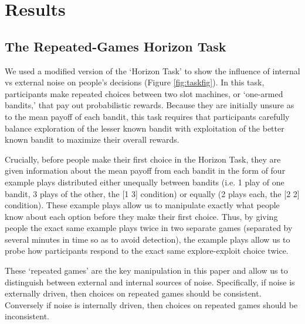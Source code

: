\documentclass[12pt]{article}
\begin{document}
	
	
	
	
	\section*{Results}
	
	\subsection*{The Repeated-Games Horizon Task}
	We used a modified version of the `Horizon Task' \citep{wilson2014} to show the influence of internal vs external noise on people's decisions (Figure \ref{fig:taskfig}). In this task, participants make repeated choices between two slot machines, or `one-armed bandits,' that pay out probabilistic rewards. Because they are initially unsure as to the mean payoff of each bandit, this task requires that participants carefully balance exploration of the lesser known bandit with exploitation of the better known bandit to maximize their overall rewards. 
	
	Crucially, before people make their first choice in the Horizon Task, they are given information about the mean payoff from each bandit in the form of four example plays distributed either unequally between bandits (i.e. 1 play of one bandit, 3 plays of the other, the [1 3] condition) or equally (2 plays each, the [2 2] condition). These example plays allow us to manipulate exactly what people know about each option before they make their first choice. Thus, by giving people the exact same example plays twice in two separate games (separated by several minutes in time so as to avoid detection), the example plays allow us to probe how participants respond to the exact same explore-exploit choice twice.  
	
	These `repeated games' are the key manipulation in this paper and allow us to distinguish between external and internal sources of noise.  Specifically, if noise is externally driven, then choices on repeated games should be consistent. Conversely if noise is internally driven, then choices on repeated games should be inconsistent.
	
\end{document}
